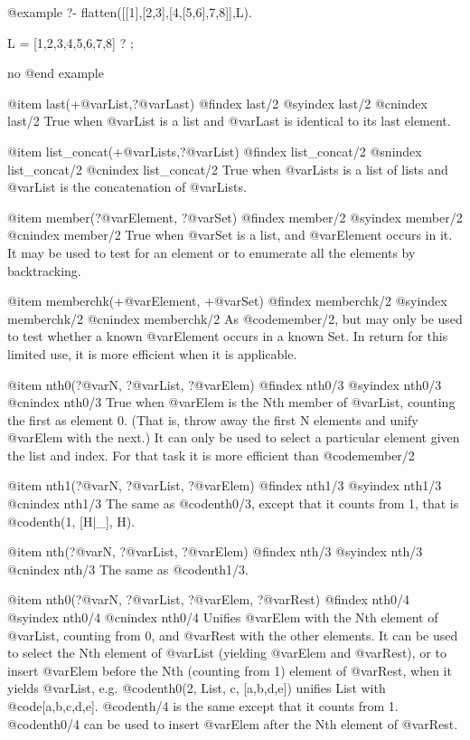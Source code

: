 {{{{{{{{@example
?- flatten([[1],[2,3],[4,[5,6],7,8]],L).

L = [1,2,3,4,5,6,7,8] ? ;

no
@end example

@item last(+@var{List},?@var{Last})
@findex last/2
@syindex last/2
@cnindex last/2
True when @var{List} is a list and @var{Last} is identical to its last element.

@item list_concat(+@var{Lists},?@var{List})
@findex list_concat/2
@snindex list_concat/2
@cnindex list_concat/2
True when @var{Lists} is a list of lists and @var{List} is the
concatenation of @var{Lists}.

@item member(?@var{Element}, ?@var{Set})
@findex member/2
@syindex member/2
@cnindex member/2
True when @var{Set} is a list, and @var{Element} occurs in it.  It may be used
to test for an element or to enumerate all the elements by backtracking.

@item memberchk(+@var{Element}, +@var{Set})
@findex memberchk/2
@syindex memberchk/2
@cnindex memberchk/2
As @code{member/2}, but may only be used to test whether a known
@var{Element} occurs in a known Set.  In return for this limited use, it
is more efficient when it is applicable.

@item nth0(?@var{N}, ?@var{List}, ?@var{Elem})
@findex nth0/3
@syindex nth0/3
@cnindex nth0/3
True when @var{Elem} is the Nth member of @var{List},
counting the first as element 0.  (That is, throw away the first
N elements and unify @var{Elem} with the next.)  It can only be used to
select a particular element given the list and index.  For that
task it is more efficient than @code{member/2}

@item nth1(?@var{N}, ?@var{List}, ?@var{Elem})
@findex nth1/3
@syindex nth1/3
@cnindex nth1/3
The same as @code{nth0/3}, except that it counts from
1, that is @code{nth(1, [H|_], H)}.

@item nth(?@var{N}, ?@var{List}, ?@var{Elem})
@findex nth/3
@syindex nth/3
@cnindex nth/3
The same as @code{nth1/3}.

@item nth0(?@var{N}, ?@var{List}, ?@var{Elem}, ?@var{Rest})
@findex nth0/4
@syindex nth0/4
@cnindex nth0/4
Unifies @var{Elem} with the Nth element of @var{List},
counting from 0, and @var{Rest} with the other elements.  It can be used
to select the Nth element of @var{List} (yielding @var{Elem} and @var{Rest}), or to
insert @var{Elem} before the Nth (counting from 1) element of @var{Rest}, when
it yields @var{List}, e.g. @code{nth0(2, List, c, [a,b,d,e])} unifies List with
@code{[a,b,c,d,e]}.  @code{nth/4} is the same except that it counts from 1.  @code{nth0/4}
can be used to insert @var{Elem} after the Nth element of @var{Rest}.

}}}}}}}}
